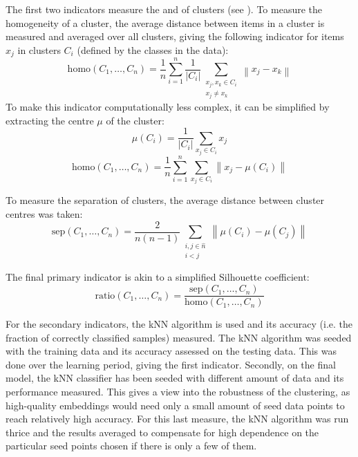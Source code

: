 The first two indicators measure the  and  of clusters (see \cite{everitt_cluster_2001}). To measure the homogeneity of a cluster, the average distance between items in a cluster is measured and averaged over all clusters, giving the following indicator for items \( x_j \) in clusters \( C_i \) (defined by the classes in the data):
\[ \mathrm{homo} \left( C_1, \dots, C_n \right) = \frac{1}{n} \sum_{i = 1}^n \frac{1}{\left\lvert C_i \right\rvert} \sum_{\substack{x_j, x_k \in C_i \\ x_j \neq x_k}} \left\lVert x_j - x_k \right\rVert \]
To make this indicator computationally less complex, it can be simplified by extracting the centre \( \mu \) of the cluster:
\[ \mu \left( C_i \right) = \frac{1}{\left\lvert C_i \right\rvert} \sum_{x_j \in C_i} x_j \]
\[ \mathrm{homo} \left( C_1, \dots, C_n \right) = \frac{1}{n} \sum_{i = 1}^n \sum_{x_j \in C_i} \left\lVert x_j - \mu \left( C_i \right) \right\rVert \]

To measure the separation of clusters, the average distance between cluster centres was taken:
\[ \mathrm{sep} \left( C_1, \dots, C_n \right) = \frac{2}{n \left( n - 1 \right)} \sum_{\substack{i, j \in \hat{n} \\ i < j }} \left\lVert \mu \left( C_i \right) - \mu \left( C_j \right) \right\rVert \]

The final primary indicator is akin to a simplified Silhouette coefficient:
\[ \mathrm{ratio} \left( C_1, \dots, C_n \right) = \frac{\mathrm{sep} \left( C_1, \dots, C_n \right)}{\mathrm{homo} \left( C_1, \dots, C_n \right)} \]

For the secondary indicators, the kNN algorithm is used and its accuracy (i.e. the fraction of correctly classified samples) measured. The kNN algorithm was seeded with the training data and its accuracy assessed on the testing data. This was done over the learning period, giving the first indicator. Secondly, on the final model, the kNN classifier has been seeded with different amount of data and its performance measured. This gives a view into the robustness of the clustering, as high-quality embeddings would need only a small amount of seed data points to reach relatively high accuracy. For this last measure, the kNN algorithm was run thrice and the results averaged to compensate for high dependence on the particular seed points chosen if there is only a few of them.

